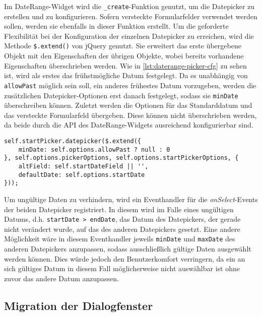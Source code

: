 Im DateRange-Widget wird die \lstinline{_create}-Funktion genutzt, um die Datepicker zu erstellen
und zu konfigurieren. Sofern versteckte Formularfelder verwendet werden sollen, werden sie ebenfalls
in dieser Funktion erstellt. Um die geforderte Flexibilität bei der Konfiguration der einzelnen
Datepicker zu erreichen, wird die Methode \lstinline{$.extend()} von jQuery genutzt. Sie erweitert
das erste übergebene Objekt mit den Eigenschaften der übrigen Objekte, wobei bereits vorhandene
Eigenschaften überschrieben werden. Wie in \autoref{lst:daterange-picker-cfg} zu sehen ist, wird als
erstes das frühstmögliche Datum festgelegt. Da es unabhängig von \lstinline{allowPast} möglich sein
soll, ein anderes frühestes Datum vorzugeben, werden die zusätzlichen Datepicker-Optionen erst
danach festgelegt, sodass sie \lstinline{minDate} überschreiben können. Zuletzt werden die Optionen
für das Standarddatum und das versteckte Formularfeld übergeben. Diese können nicht überschrieben
werden, da beide durch die API des DateRange-Widgets ausreichend konfigurierbar sind.

\begin{lstlisting}[label=lst:daterange-picker-cfg,caption=Datepicker-Konfiguration im DateRange-Widget]
self.startPicker.datepicker($.extend({
    minDate: self.options.allowPast ? null : 0
}, self.options.pickerOptions, self.options.startPickerOptions, {
    altField: self.startDateField || '',
    defaultDate: self.options.startDate
}));
\end{lstlisting}


Um ungültige Daten zu verhindern, wird ein Eventhandler für die \emph{onSelect}-Events der beiden
Datepicker registriert. In diesem wird im Falle eines ungültigen Datums, d.h.
\lstinline{startDate > endDate}, das Datum des Datepickers, der gerade nicht verändert wurde, auf
das des anderen Datepickers gesetzt. Eine andere Möglichkeit wäre in diesem Eventhandler jeweils
\lstinline{minDate} und \lstinline{maxDate} des anderen Datepickers anzupassen, sodass
ausschließlich gültige Daten ausgewählt werden können. Dies würde jedoch den Benutzerkomfort
verringern, da ein an sich gültiges Datum in diesem Fall möglicherweise nicht auswählbar ist ohne
zuvor das andere Datum anzupassen.



\subsection{Migration der Dialogfenster}

